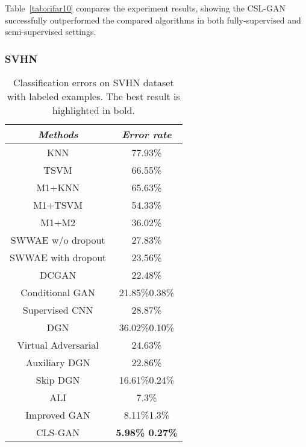 \documentclass[11pt,fullpage, letterpaper,twoside]{article}
\newcommand{\1}[1]{\mathds{1}_{\left[#1\right]}}
\begin{document}
Table~\ref{tab:cifar10} compares the experiment results, showing the CSL-GAN successfully outperformed the compared algorithms in both fully-supervised and semi-supervised settings.



\subsubsection{SVHN}

\begin{table}[t]
\caption{Classification errors on SVHN dataset with  labeled examples. The best result is highlighted in bold.}
\label{tab:svhn}
\begin{center}
\begin{tabular}{c||c}    \toprule
\emph{Methods} & \emph{Error rate} \\\midrule
KNN \cite{radford2015unsupervised}& 77.93\%\\
TSVM \cite{radford2015unsupervised}& 66.55\%\\
M1+KNN \cite{kingma2014semi}& 65.63\%\\
M1+TSVM \cite{kingma2014semi}& 54.33\%\\
M1+M2 \cite{kingma2014semi}& 36.02\%\\\midrule
SWWAE w/o dropout \cite{zhao2015stacked}& 27.83\%\\
SWWAE with dropout \cite{zhao2015stacked}& 23.56\%\\
DCGAN \cite{radford2015unsupervised}& 22.48\%\\
Conditional GAN \cite{mirza2014conditional}& 21.85\%0.38\%\\
Supervised CNN \cite{radford2015unsupervised}& 28.87\%\\
DGN \cite{kingma2014semi} &36.02\%0.10\%\\
Virtual Adversarial \cite{miyato2015distributional} &24.63\%\\
Auxiliary DGN \cite{maaloe2016auxiliary} &22.86\%\\
Skip DGN \cite{maaloe2016auxiliary}&16.61\%0.24\%\\
ALI \cite{dumoulin2016adversarially} & 7.3\%\\
Improved GAN \cite{salimans2016improved}&8.11\%1.3\%\\\midrule
CLS-GAN & {\bf 5.98\% 0.27\%}\\\bottomrule
\end{tabular}
\vspace{-2mm}
\end{center}
\end{table}
\end{document}
